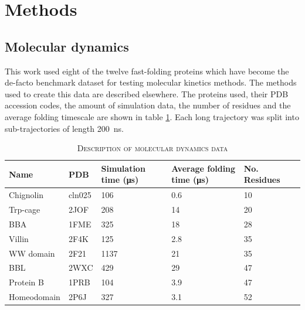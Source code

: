 \documentclass[journal=jacsat,manuscript=article]{achemso}
\begin{document}
\section{Methods}
\subsection{Molecular dynamics}

This work used eight of the twelve fast-folding proteins which have become the de-facto benchmark dataset for testing molecular kinetics methods. The methods used to create this data are described elsewhere. The proteins used, their PDB accession codes, the amount of simulation data, the number of residues and the average folding timescale are shown in table \ref{tab:data_description}. Each long trajectory was split into sub-trajectories of length \SI{200}{\nano\second}. 

\begin{table}
    \caption{\textsc{Description of molecular dynamics data}}
    \begin{tabularx}{\textwidth}{llXXXX}
    \toprule
    Name & PDB & Simulation time (\si{\micro\second}) & Average folding time (\si{\micro\second}) & No. Residues & \\
    \midrule
    Chignolin           & cln025    & \num{106}     & \num{0.6} & 10 & \\
    Trp-cage            & 2JOF      & \num{208}     & \num{14}  & 20 & \\
    BBA                 & 1FME      & \num{325}     & \num{18}  & 28 & \\
    Villin              & 2F4K      & \num{125}     & \num{2.8} & 35  &\\
    WW domain           & 2F21      & \num{1137}    & \num{21}  & 35 & \\
    BBL                 & 2WXC      & \num{429}     & \num{29}  & 47  &\\
    Protein B           & 1PRB      & \num{104}     & \num{3.9} & 47 & \\
    Homeodomain         & 2P6J      & \num{327}     & \num{3.1} & 52 & \\
    \bottomrule
    \end{tabularx}
    \label{tab:data_description}
\end{table}
\end{document}
